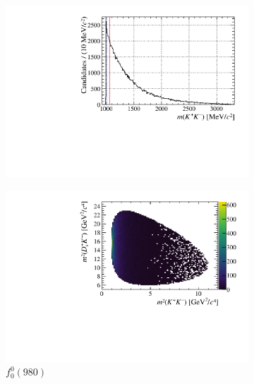 \begin{figure}[!ht]
    \begin{subfigure}[t]{0.32\textwidth}    
        \centering 
        \includegraphics[width=1.0\textwidth]{figs/B2DsPhi/f0_phi_mass.pdf}
    \end{subfigure}
    \begin{subfigure}[t]{0.32\textwidth}    
        \centering 
        \includegraphics[width=1.0\textwidth]{figs/B2DsPhi/f0_Dalitz_plot.pdf}
        \caption{$f_{0}^{0}(980)$}
    \end{subfigure}
    \begin{subfigure}[t]{0.32\textwidth}    
        \centering 

\end{subfigure}
\end{figure}
